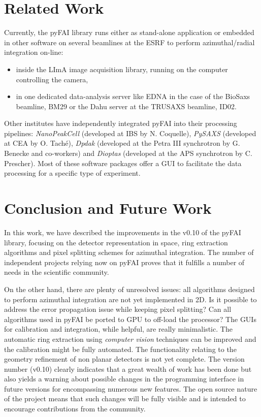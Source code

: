 \documentclass{iucr}
\begin{document}
\section{Related Work}

Currently, the pyFAI library runs either as stand-alone application or
embedded in other software on several beamlines at the ESRF to
perform azimuthal/radial integration on-line:
\begin{itemize}
  \item inside the LImA image acquisition library, running on the
  computer controlling the camera,
  \item in one dedicated data-analysis server like EDNA \cite{edna} in the case
  of the BioSaxs beamline, BM29 \cite{bm29} or the Dahu server at the TRUSAXS
  beamline, ID02.
\end{itemize}

Other institutes have independently integrated pyFAI into their processing
pipelines: \textit{NanoPeakCell} (developed at IBS by N. Coquelle),
\textit{PySAXS} (developed at CEA by O. Taché), \textit{Dpdak} (developed
at the Petra III synchrotron by G. Benecke and co-workers) \cite{dpdak}
and \textit{Dioptas} (developed at the APS synchrotron by C. Prescher).
Most of these software packages offer a GUI to facilitate the
data processing for a specific type of experiment.

\section{Conclusion and Future Work}

In this work, we have described the improvements in the
v0.10 of the pyFAI library, focusing on the detector representation in space, ring
extraction algorithms and pixel splitting schemes for azimuthal integration.
The number of independent projects relying now on pyFAI proves that it fulfills a
number of needs in the scientific community.

On the other hand, there are plenty of unresolved issues: all
algorithms designed to perform azimuthal integration are not yet implemented in
2D. Is it possible to address the error propagation issue while keeping pixel
splitting? Can all algorithms used in pyFAI be ported to GPU to off-load the
processor? The GUIs for calibration and integration, while helpful, are really
minimalistic.
The automatic ring extraction using \textit{computer vision} techniques can
be improved and the calibration might be fully automated.
The functionality relating to the geometry refinement of non planar
detectors is not yet complete.
The version number (v0.10) clearly indicates that a great
wealth of work has been done but also yields a warning about possible changes
in the programming interface in future versions for encompassing numerous new
features.
The open source nature of the project means that such changes will be 
fully visible and is intended to encourage contributions from the community.
\end{document}
